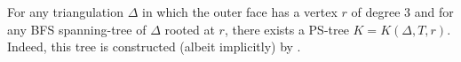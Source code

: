 \documentclass{patmorin}
\DeclareMathOperator{\dist}{dist}
\renewcommand{\propref}[1]{(PR\ref{prop:#1})}
\begin{document}
For any triangulation $\Delta$ in which the outer face has a vertex $r$ of degree 3 and for any BFS spanning-tree of $\Delta$ rooted at $r$, there exists a PS-tree $K=K(\Delta,T,r)$.  Indeed, this tree is constructed (albeit implicitly) by \citet[Proof of Lemma~14]{dujmovic.joret.ea:planar}.

% 
% 
% 
% 
% 
\end{document}
